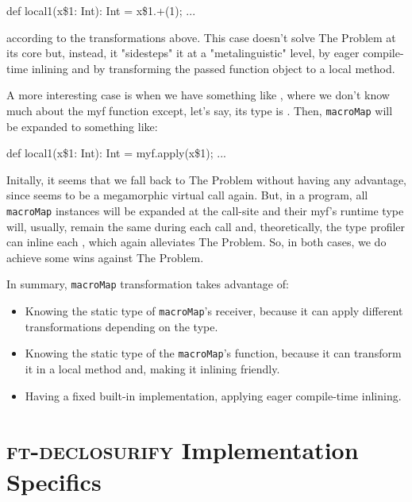 \begin{scalaCode}
{
  def local1(x\$1: Int): Int = x\$1.+(1);
  ...
}
\end{scalaCode}

according to the transformations above. This case doesn't solve The Problem
at its core but, instead, it "sidesteps" it at a "metalinguistic" level, by
eager compile-time inlining and by transforming the passed function
object to a local method.

A more interesting case is when we have something like , where we don't know much about the myf function except, let's
say, its type is . Then, \texttt{macroMap} will be expanded to something
like:

\begin{scalaCode}
{
 def local1(x\$1: Int): Int = myf.apply(x\$1);
  ...
}
\end{scalaCode}

Initally, it seems that we fall back to The Problem without having any
advantage, since  seems to be a megamorphic virtual call again.
But, in a program, all \texttt{macroMap} instances will be expanded at the call-site and their myf's
runtime type will, usually, remain the same during each call and, theoretically,
the type profiler can inline each , which again alleviates 
The Problem. So, in both cases, we do achieve some wins against The Problem.

In summary, \texttt{macroMap} transformation takes advantage of:
\begin{itemize}
 \item Knowing the static type of \texttt{macroMap}'s receiver, because it can apply different transformations depending on the type.
  \item Knowing the static type of the \texttt{macroMap}'s function, because it can transform it in a local method and, making it inlining friendly.
  \item Having a fixed built-in implementation, applying eager compile-time inlining.
\end{itemize}


\section{\textsc{ft-declosurify} Implementation Specifics}
\label{ft_declosurify_impl}


